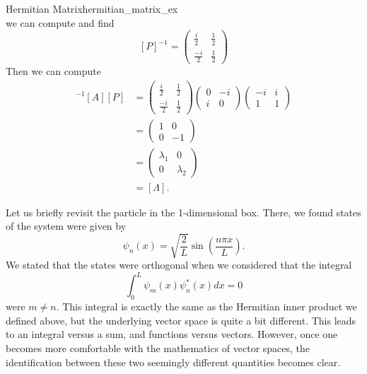 \begin{ex}{Hermitian Matrix}{hermitian_matrix_ex}
\[                \]
                we can compute and find
                \[
                [P]^{-1} = \begin{pmatrix}
                \frac{i}{2} & \frac{1}{2} \\ \frac{-i}{2} & \frac{1}{2} \end{pmatrix}
                \]
                Then we can compute
                \begin{align*}
                    [P]^{-1}[A][P]&=\begin{pmatrix}
                \frac{i}{2} & \frac{1}{2} \\ \frac{-i}{2} & \frac{1}{2} \end{pmatrix} \begin{pmatrix} 0 & -i \\ i & 0 \end{pmatrix} \begin{pmatrix} -i & i \\ 1 & 1 \end{pmatrix}\\
                &= \begin{pmatrix} 1 & 0 \\ 0 & -1 \end{pmatrix}\\
                &= \begin{pmatrix} \lambda_1 & 0 \\ 0 & \lambda_2 \end{pmatrix}\\
                &= [\Lambda].
                \end{align*}
            \end{ex}
            
            Let us briefly revisit the particle in the 1-dimensional box.  There, we found states of the system were given by
            \[
            \psi_n(x) = \sqrt{\frac{2}{L}} \sin\left(\frac{n\pi x}{L}\right).
            \]
            We stated that the states were orthogonal when we considered that the integral
            \[
            \int_0^L \psi_m(x) \psi_n^*(x) dx = 0
            \]
            were $m\neq n$.  This integral is exactly the same as the Hermitian inner product we defined above, but the underlying vector space is quite a bit different. This leads to an integral versus a sum, and functions versus vectors.  However, once one becomes more comfortable with the mathematics of vector spaces, the identification between these two seemingly different quantities becomes clear. 
            
